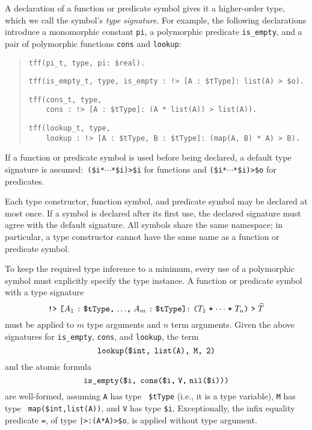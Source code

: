 A declaration of a function or predicate symbol gives it a higher-order
type, which we call the symbol's {\em type signature}. For example, the following
declarations introduce a monomorphic constant {\tt pi}, a polymorphic predicate
{\tt is\_empty}, and a pair of polymorphic functions {\tt cons} and {\tt lookup}:
\begin{quote}
\verb+tff(pi_t, type, pi: $real).+
\par\smallskip
\verb+tff(is_empty_t, type, is_empty : !> [A : $tType]: list(A) > $o).+\kern-10mm
\par\smallskip
\verb+tff(cons_t, type,+\\
\verb+    cons : !> [A : $tType]: (A * list(A)) > list(A)).+
\par\smallskip
\verb+tff(lookup_t, type,+\\
\verb+    lookup : !> [A : $tType, B : $tType]: (map(A, B) * A) > B).+
\end{quote}
If a function or predicate symbol is used before being declared, a
default type signature is assumed:\ {\tt (\$i\;*\;${\cdots}$\;*\;\$i)\;>\;\$i}
for functions and {\tt (\$i\;*\;${\cdots}$\;*\;\$i)\;>\;\$o} for predicates.

Each type constructor, function symbol, and predicate symbol may be declared at
most once. If a symbol is declared after its first use, the declared signature
must agree with the default signature. All symbols share the same namespace; in
particular, a type constructor cannot have the same name as a function or
predicate symbol.


 To keep the required type
inference to a minimum, every use of a polymorphic symbol must explicitly
specify the type instance. A function or predicate symbol with a type signature
\[\hbox{{\tt !>} {\tt [$A_1$\;:\;\$tType,\;${\dots}$,\;$A_m$\;:\;\$tType]:\;%
($T_1$\;*\;${\cdots}$\;*\;$T_n$)\;>\;$\widehat T$}}\]
must be applied to $m$ type arguments and $n$ term arguments. Given the above
signatures for {\tt is\_empty}, {\tt cons}, and {\tt lookup}, the term
\[\hbox{\tt lookup(\$int,\;\,list(A),\;\,M,\;\,2)}\]
and the atomic formula
\[\hbox{\tt is\_empty(\$i,\;\,cons(\$i,\;V,\;nil(\$i)))}\]
are well-formed, assuming {\tt A} has type {\tt
\$tType} (i.e., it is a type variable), {\tt M} has type {\tt
map(\$int,\;list(A))}, and {\tt V} has type {\tt \$i}, 
Exceptionally, the infix equality predicate {\tt =}, of type
{\tt |>\;[A\;:\;\$tType]:\;(A\;*\;A)\;>\;\$o}, is applied without type argument.


